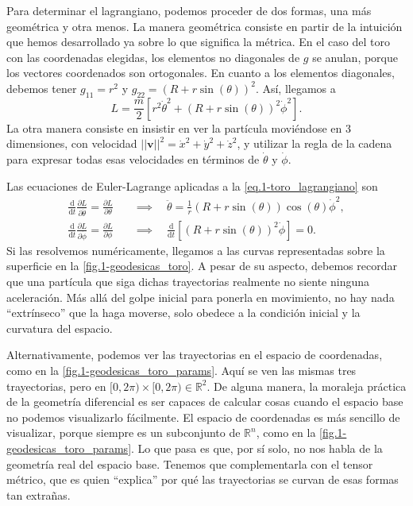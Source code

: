 \begin{example}
    Para determinar el lagrangiano, podemos proceder de dos formas, una más geométrica y otra menos. La manera geométrica consiste en partir de la intuición que hemos desarrollado ya sobre lo que significa la métrica. En el caso del toro con las coordenadas elegidas, los elementos no diagonales de \(g\) se anulan, porque los vectores coordenados son ortogonales. En cuanto a los elementos diagonales, debemos tener \(g_{11} = r^2\) y \(g_{22} = \left(R + r\sin(\theta)\right)^2\). Así, llegamos a 
    \begin{equation}
        \label{eq.1-toro_lagrangiano}
        L = \frac{m}{2}\left[r^2 \dot{\theta}^2 + \left(R + r\sin(\theta)\right)^2\dot{\phi}^2\right].
    \end{equation}
    La otra manera consiste en insistir en ver la partícula moviéndose en 3 dimensiones, con velocidad \(||\mathbf{v}||^2 = \dot{x}^2 + \dot{y}^2 + \dot{z}^2\), y utilizar la regla de la cadena para expresar todas esas velocidades en términos de \(\dot{\theta}\) y \(\dot{\phi}\).

    Las ecuaciones de Euler-Lagrange aplicadas a la \cref{eq.1-toro_lagrangiano} son
    \begin{align*}
        \frac{\mathrm{d}}{\mathrm{d}t}\frac{\partial L}{\partial \dot{\theta}} = \frac{\partial L}{\partial \theta} 
        \quad&\implies\quad
        \ddot{\theta} = \frac{1}{r}\left(R + r\sin(\theta)\right)\cos(\theta)\dot{\phi}^2, 
        \\
        \frac{\mathrm{d}}{\mathrm{d}t}\frac{\partial L}{\partial \dot{\phi}} = \frac{\partial L}{\partial \phi}
        \quad&\implies\quad  \frac{\mathrm{d}}{\mathrm{d}t}\left[\left(R+r\sin(\theta)\right)^2\dot{\phi}\right] = 0.
    \end{align*}
    Si las resolvemos numéricamente, llegamos a las curvas representadas sobre la superficie en la \cref{fig.1-geodesicas_toro}. A pesar de su aspecto, debemos recordar que una partícula que siga dichas trayectorias realmente no siente ninguna aceleración. Más allá del golpe inicial para ponerla en movimiento, no hay nada ``extrínseco'' que la haga moverse, solo obedece a la condición inicial y la curvatura del espacio. 
    
    Alternativamente, podemos ver las trayectorias en el espacio de coordenadas, como en la \cref{fig.1-geodesicas_toro_params}. Aquí se ven las mismas tres trayectorias, pero en \([0, 2\pi)\times[0, 2\pi)\in\mathbb{R}^2\). De alguna manera, la moraleja práctica de la geometría diferencial es ser capaces de calcular cosas cuando el espacio base no podemos visualizarlo fácilmente. El espacio de coordenadas es más sencillo de visualizar, porque siempre es un subconjunto de \(\mathbb{R}^n\), como en la \cref{fig.1-geodesicas_toro_params}. Lo que pasa es que, por sí solo, no nos habla de la geometría real del espacio base. Tenemos que complementarla con el tensor métrico, que es quien ``explica'' por qué las trayectorias se curvan de esas formas tan extrañas.
    

\end{example}
